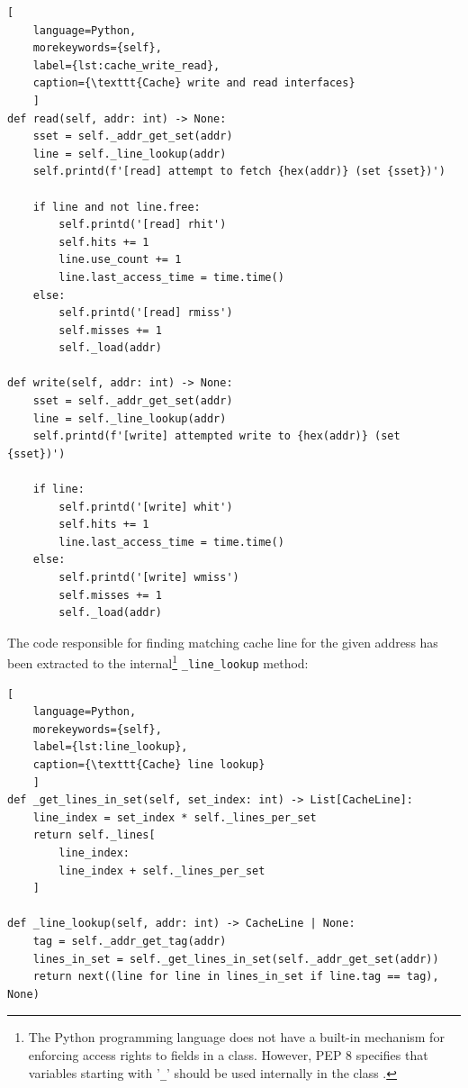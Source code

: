 \begin{center}
\centering
\begin{minipage}{\linewidth}
\begin{lstlisting}[
    language=Python,
	morekeywords={self},
    label={lst:cache_write_read},
    caption={\texttt{Cache} write and read interfaces}
    ]
def read(self, addr: int) -> None:
    sset = self._addr_get_set(addr)
    line = self._line_lookup(addr)
    self.printd(f'[read] attempt to fetch {hex(addr)} (set {sset})')

    if line and not line.free:
        self.printd('[read] rhit')
        self.hits += 1
        line.use_count += 1
        line.last_access_time = time.time()
    else:
        self.printd('[read] rmiss')
        self.misses += 1
        self._load(addr)

def write(self, addr: int) -> None:
    sset = self._addr_get_set(addr)
    line = self._line_lookup(addr)
    self.printd(f'[write] attempted write to {hex(addr)} (set {sset})')

    if line:
        self.printd('[write] whit')
        self.hits += 1
        line.last_access_time = time.time()
    else:
        self.printd('[write] wmiss')
        self.misses += 1
        self._load(addr)
\end{lstlisting}
\end{minipage}
\end{center}

\noindent The code responsible for finding matching cache line for the given address has been extracted to the internal\footnote{The Python programming language does not have a
built-in mechanism for enforcing access rights to fields in a class. However, PEP 8 specifies that variables starting with '\texttt{\_}' should be used internally in the class
\cite{pep8}.} \texttt{\_line\_lookup} method:

\begin{center}
\centering
\begin{minipage}{\linewidth}
\begin{lstlisting}[
    language=Python,
	morekeywords={self},
    label={lst:line_lookup},
    caption={\texttt{Cache} line lookup}
    ]
def _get_lines_in_set(self, set_index: int) -> List[CacheLine]:
    line_index = set_index * self._lines_per_set
    return self._lines[
        line_index:
        line_index + self._lines_per_set
    ]

def _line_lookup(self, addr: int) -> CacheLine | None:
    tag = self._addr_get_tag(addr)
    lines_in_set = self._get_lines_in_set(self._addr_get_set(addr))
    return next((line for line in lines_in_set if line.tag == tag), None)
\end{lstlisting}
\end{minipage}
\end{center}

